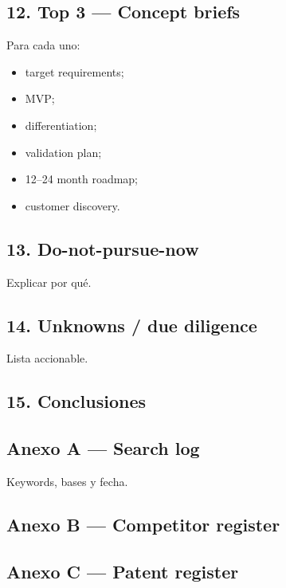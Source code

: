 \documentclass[11pt,a4paper]{article}
\begin{document}
\subsection*{12. Top 3 — Concept briefs}
Para cada uno:

\begin{itemize}
\item target requirements;
\item MVP;
\item differentiation;
\item validation plan;
\item 12–24 month roadmap;
\item customer discovery.
\end{itemize}


\subsection*{13. Do-not-pursue-now}
Explicar por qué.


\subsection*{14. Unknowns / due diligence}
Lista accionable.


\subsection*{15. Conclusiones}

\subsection*{Anexo A — Search log}
Keywords, bases y fecha.


\subsection*{Anexo B — Competitor register}

\subsection*{Anexo C — Patent register}
\end{document}
